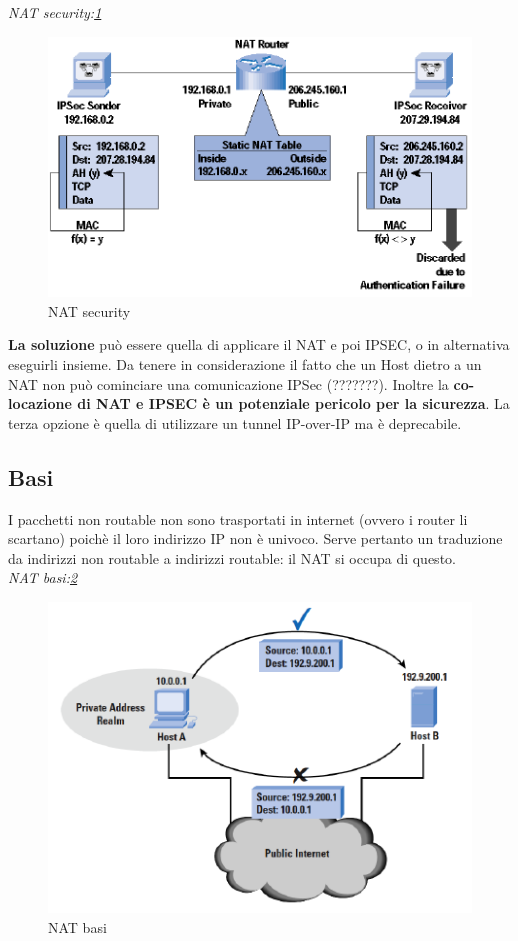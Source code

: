 \documentclass[12pt]{article}
\begin{document}
			\textit{NAT security:\ref{fig:5}}
			\begin{figure}[h!]
				\centering
				\includegraphics[scale=0.60]{img/natipsec.PNG}
				\caption{NAT security\label{fig:5}}
			\end{figure}
			
			\textbf{La soluzione} può essere quella di applicare il NAT e poi IPSEC, o in alternativa eseguirli insieme. Da tenere in considerazione il fatto che un Host dietro a un NAT non può cominciare una comunicazione IPSec (???????). Inoltre la \textbf{co-locazione di NAT e IPSEC è un potenziale pericolo per la sicurezza}. La terza opzione è quella di utilizzare un tunnel IP-over-IP ma è deprecabile.
		\subsection{Basi}
			I pacchetti non routable non sono trasportati in internet (ovvero i router li scartano) poichè il loro indirizzo IP non è univoco. Serve pertanto un traduzione da indirizzi non routable a indirizzi routable: il NAT si occupa di questo.\\
			
			\textit{NAT basi:\ref{fig:6}}
			\begin{figure}[h!]
				\centering
				\includegraphics[scale=0.60]{img/basi.PNG}
				\caption{NAT basi\label{fig:6}}
			\end{figure}
			
\end{document}
